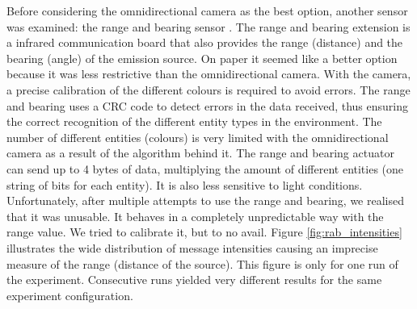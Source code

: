 \documentclass[oneside, a4paper, 12pt]{memoir}
\begin{document}

		Before considering the omnidirectional camera as the best option, another sensor was examined: the range and bearing sensor \citep{gutierrez2009open}. The range and bearing extension is a infrared communication board that also provides the range (distance) and the bearing (angle) of the emission source. On paper it seemed like a better option because it was less restrictive than the omnidirectional camera. With the camera, a precise calibration of the different colours is required to avoid errors. The range and bearing uses a CRC code to detect errors in the data received, thus ensuring the correct recognition of the different entity types in the environment. The number of different entities (colours) is very limited with the omnidirectional camera as a result of the algorithm behind it. The range and bearing actuator can send up to 4 bytes of data, multiplying the amount of different entities (one string of bits for each entity). It is also less sensitive to light conditions. Unfortunately, after multiple attempts to use the range and bearing, we realised that it was unusable. It behaves in a completely unpredictable way with the range value. We tried to calibrate it, but to no avail. Figure \ref{fig:rab_intensities} illustrates the wide distribution of message intensities causing an imprecise measure of the range (distance of the source). This figure is only for one run of the experiment. Consecutive runs yielded very different results for the same experiment configuration.
		
\end{document}
